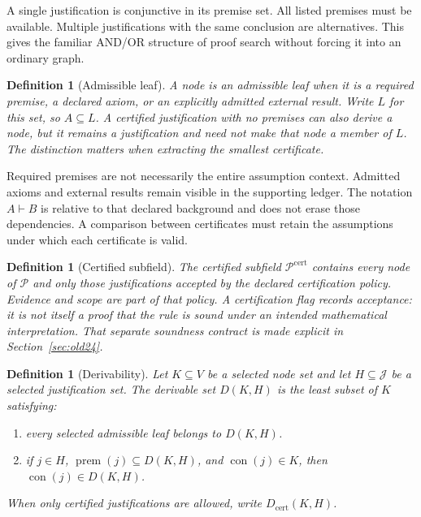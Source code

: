 \documentclass[11pt,oneside]{article}
\theoremstyle{komorebiplain}
\theoremstyle{komorebidefinition}
\newtheorem{definition}[theorem]{Definition}
\theoremstyle{komorebiremark}
\newcommand{\Pcal}{\mathcal P}
\newcommand{\Jcal}{\mathcal J}
\begin{document}
A single justification is conjunctive in its premise set. All listed premises must be available. Multiple justifications with the same conclusion are alternatives. This gives the familiar AND/OR structure of proof search without forcing it into an ordinary graph.

\begin{definition}[Admissible leaf]
\label{res:3:2}
A node is an admissible leaf when it is a required premise, a declared axiom, or an explicitly admitted external result. Write $L$ for this set, so $A\subseteq L$. A certified justification with no premises can also derive a node, but it remains a justification and need not make that node a member of $L$. The distinction matters when extracting the smallest certificate.
\end{definition}

Required premises are not necessarily the entire assumption context. Admitted axioms and external results remain visible in the supporting ledger. The notation $A\vdash B$ is relative to that declared background and does not erase those dependencies. A comparison between certificates must retain the assumptions under which each certificate is valid.

\begin{definition}[Certified subfield]
\label{res:3:3}
The certified subfield $\Pcal^{\mathrm{cert}}$ contains every node of $\Pcal$ and only those justifications accepted by the declared certification policy. Evidence and scope are part of that policy. A certification flag records acceptance: it is not itself a proof that the rule is sound under an intended mathematical interpretation. That separate soundness contract is made explicit in Section~\ref{sec:old24}.
\end{definition}

\begin{definition}[Derivability]
\label{res:3:4}
Let $K\subseteq V$ be a selected node set and let $H\subseteq\Jcal$ be a selected justification set. The derivable set $D(K,H)$ is the least subset of $K$ satisfying:
\begin{enumerate}[label=\textup{(\roman*)}]
\item every selected admissible leaf belongs to $D(K,H)$.
\item if $j\in H$, $\operatorname{prem}(j)\subseteq D(K,H)$, and $\operatorname{con}(j)\in K$, then $\operatorname{con}(j)\in D(K,H)$.
\end{enumerate}
When only certified justifications are allowed, write $D_{\mathrm{cert}}(K,H)$.
\end{definition}
\end{document}
